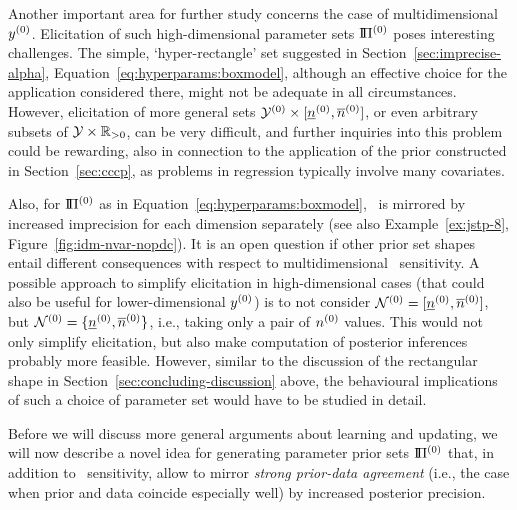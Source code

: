 
Another important area for further study concerns the case of multidimensional $y^{(0)}$.
Elicitation of such high-dimensional parameter sets $\text{I}\!\Pi^{(0)}$ poses interesting challenges.
The simple, `hyper-rectangle' set suggested in Section~\ref{sec:imprecise-alpha}, Equation~\eqref{eq:hyperparams:boxmodel},
although an effective choice for the application considered there,
might not be adequate in all circumstances.
However, elicitation of more general sets $\mathcal{Y}^{(0)} \times [\underline{n}^{(0)}, \overline{n}^{(0)}]$,
or even arbitrary subsets of $\mathcal{Y} \times \mathbb{R}_{>0}$, can be very difficult,
and further inquiries into this problem could be rewarding,
also in connection to the application of the prior constructed in Section~\ref{sec:cccp},
as problems in regression typically involve many covariates.

Also, for $\text{I}\!\Pi^{(0)}$ as in Equation~\eqref{eq:hyperparams:boxmodel},
\pdc\ is mirrored by increased imprecision for each dimension separately
(see also Example~\ref{ex:jstp-8}, Figure~\ref{fig:idm-nvar-nopdc}).
It is an open question if other prior set shapes entail
different consequences with respect to multidimensional \pdc\ sensitivity. 
A possible approach to simplify elicitation in high-dimensional cases
(that could also be useful for lower-dimensional $y^{(0)}$) is to not consider
$\mathcal{N}^{(0)} = [\underline{n}^{(0)}, \overline{n}^{(0)}]$, but $\mathcal{N}^{(0)} = \{\underline{n}^{(0)}, \overline{n}^{(0)}\}$,
i.e., taking only a pair of $n^{(0)}$ values.
This would not only simplify elicitation, but also make computation of posterior inferences
probably more feasible.
However, similar to the discussion of the rectangular shape in Section~\ref{sec:concluding-discussion} above,
the behavioural implications of such a choice of parameter set would have to be studied in detail.

Before we will discuss more general arguments about learning and updating,
we will now describe a novel idea for generating parameter prior sets $\text{I}\!\Pi^{(0)}$
that, in addition to \pdc\ sensitivity, allow to mirror \emph{strong prior-data agreement}
(i.e., the case when prior and data coincide especially well)
by increased posterior precision.

